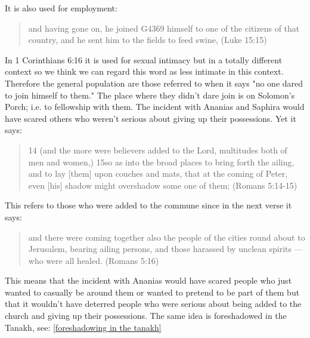 \documentclass[11pt]{article}
\begin{document}
It is also used for employment:
\begin{quote}
and having gone on, he joined G4369 himself to one of the citizens of that country, and he sent him to the fields to feed swine,
(Luke 15:15)
\end{quote}
In 1 Corinthians 6:16 it is used for sexual intimacy but in a totally different context so we think we can regard this word as less intimate in this context. Therefore the general population are those referred to when it says "no one dared to join himself to them." The place where they didn't dare join is on Solomon's Porch; i.e. to fellowship with them. The incident with Ananias and Saphira would have scared others who weren't serious about giving up their possessions. Yet it says:
\begin{quote}
14 (and the more were believers added to the Lord, multitudes both of men and women,) 15so as into the broad places to bring forth the ailing, and to lay [them] upon couches and mats, that at the coming of Peter, even [his] shadow might overshadow some one of them; (Romans 5:14-15)
\end{quote}
 This refers to those who were added to the commune since in the next verse it says: 
\begin{quote}
and there were coming together also the people of the cities round about to Jerusalem, bearing ailing persons, and those harassed by unclean spirits — who were all healed. (Romans 5:16)
\end{quote}
This means that the incident with Ananias would have scared people who just wanted to casually be around them or wanted to pretend to be part of them but that it wouldn't have deterred people who were serious about being added to the church and giving up their possessions. The same idea is foreshadowed in the Tanakh, see: \ref{foreshadowing in the tanakh}
\end{document}
